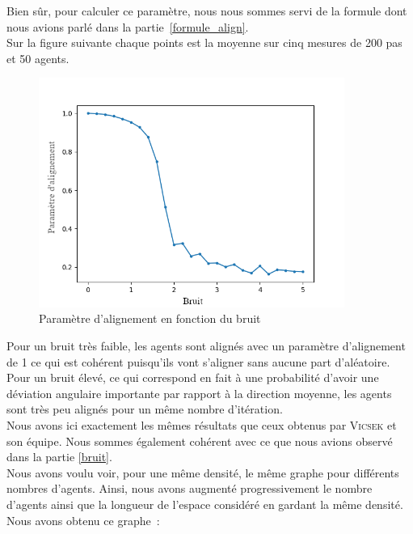 \documentclass[french, a4paper, 12pt, openany]{report}
\begin{document}
	Bien sûr, pour calculer ce paramètre, nous nous sommes servi de la formule dont nous avions parlé dans la partie~\ref{formule_align}.\\
	
	Sur la figure suivante chaque points est la moyenne sur cinq mesures de 200 pas et 50 agents.
	\begin{figure}[!h]
		\centering
		\includegraphics[width=10cm]{images/bruit_4bis.png}
		\caption{Paramètre d'alignement en fonction du bruit}
		\label{param_bruit}
	\end{figure}
	
	\newpage
	Pour un bruit très faible, les agents sont alignés avec un paramètre d'alignement de 1 ce qui est cohérent puisqu'ils vont s'aligner sans aucune part d'aléatoire. Pour un bruit élevé, ce qui correspond en fait à une probabilité d'avoir une déviation angulaire importante par rapport à la direction moyenne, les agents sont très peu alignés pour un même nombre d'itération. \\
	
	Nous avons ici exactement les mêmes résultats que ceux obtenus par \textsc{Vicsek} et son équipe. Nous sommes également cohérent avec ce que nous avions observé dans la partie \ref{bruit}.\\
	
	Nous avons voulu voir, pour une même densité, le même graphe pour différents nombres d'agents. Ainsi, nous avons augmenté progressivement le nombre d'agents ainsi que la longueur de l'espace considéré en gardant la même densité. Nous avons obtenu ce graphe~:
	
\end{document}
